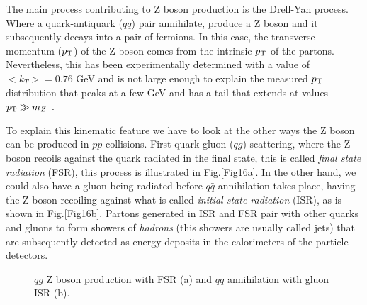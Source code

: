 The main process contributing to Z boson production is the Drell-Yan process. Where a quark-antiquark ($q\bar{q}$) pair annihilate, produce a Z boson and it subsequently decays into a pair of fermions. In this case, the transverse momentum ($p_\text{T}$) of the Z boson comes from the intrinsic $p_\text{T}$ of the partons. Nevertheless, this has been experimentally determined with a value of $<k_T>=0.76$ GeV \cite{Ellis:1991qj} and is not large enough to explain the measured $p_\text{T}$ distribution that peaks at a few GeV and has a tail that extends at values $p_\text{T}\gg m_Z$ \cite{Abbott:1999yd,Affolder:1999jh}.

To explain this kinematic feature we have to look at the other ways the Z boson can be produced in $pp$ collisions. First quark-gluon ($qg$) scattering, where the Z boson recoils against the quark radiated in the final state, this is called \textit{final state radiation} (FSR), this process is illustrated in Fig.\ref{Fig16a}. In the other hand, we could also have a gluon being radiated before $q\bar{q}$ annihilation takes place, having the Z boson recoiling against what is called \textit{initial state radiation} (ISR), as is shown in Fig.\ref{Fig16b}. Partons generated in ISR and FSR pair with other quarks and gluons to form showers of \textit{hadrons} (this showers are usually called jets) that are subsequently detected as energy deposits in the calorimeters of the particle detectors. 
\begin{figure}[ht]
	\centering
	\hfill
	\caption{$qg$ Z boson production with FSR (a) and $q\bar{q}$ annihilation with gluon ISR (b).}
	\label{Fig16}
\end{figure}
